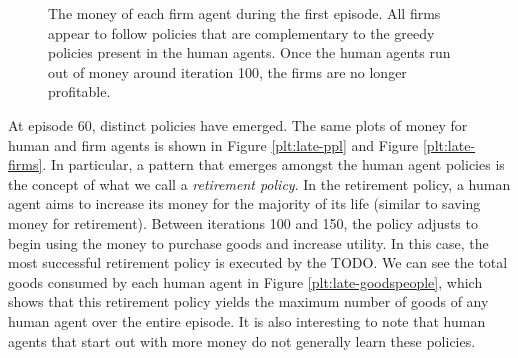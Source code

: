 \documentclass[twoside,twocolumn]{article}
\begin{document}
\begin{figure}[h]
  \caption{The money of each firm agent during the first episode. All firms appear to follow policies that are complementary to the greedy policies present in the human agents. Once the human agents run out of money around iteration 100, the firms are no longer profitable.}
  \label{plt:init-firms}
\end{figure}

At episode 60, distinct policies have emerged. The same plots of money for human and firm agents is shown in Figure \ref{plt:late-ppl} and Figure \ref{plt:late-firms}. In particular, a pattern that emerges amongst the human agent policies is the concept of what we call a \textit{retirement policy}. In the retirement policy, a human agent aims to increase its money for the majority of its life (similar to saving money for retirement). Between iterations 100 and 150, the policy adjusts to begin using the money to purchase goods and increase utility. In this case, the most successful retirement policy is executed by the TODO. We can see the total goods consumed by each human agent in Figure \ref{plt:late-goodspeople}, which shows that this retirement policy yields the maximum number of goods of any human agent over the entire episode. It is also interesting to note that human agents that start out with more money do not generally learn these policies.
\end{document}
